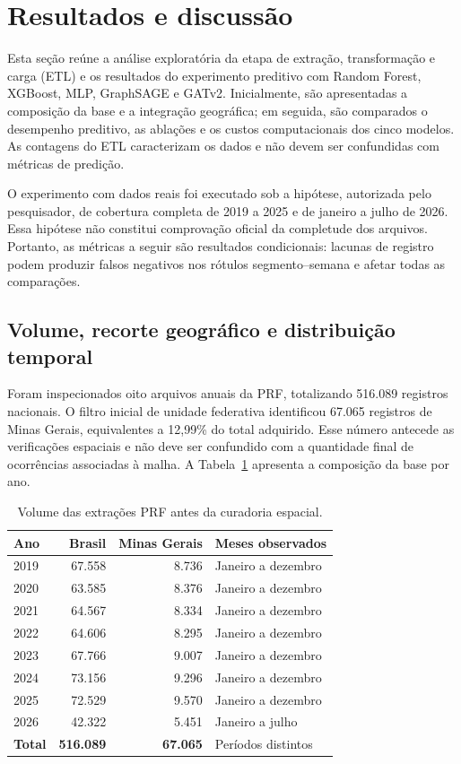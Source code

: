 \documentclass[12pt]{article}
\begin{document}
\section{Resultados e discussão}
\label{sec:resultados-preliminares}
\label{sec:resultados}

Esta seção reúne a análise exploratória da etapa de extração,
transformação e carga (ETL) e os resultados do experimento preditivo
com Random Forest, XGBoost, MLP, GraphSAGE e GATv2. Inicialmente, são
apresentadas a composição da base e a
integração geográfica; em seguida, são comparados o desempenho
preditivo, as ablações e os custos computacionais dos cinco modelos.
As contagens do ETL caracterizam os dados e não devem ser confundidas
com métricas de predição.

O experimento com dados reais foi executado sob a hipótese, autorizada
pelo pesquisador, de cobertura completa de 2019 a 2025 e de janeiro a
julho de 2026. Essa hipótese não constitui comprovação oficial da
completude dos arquivos. Portanto, as métricas a seguir são resultados
condicionais: lacunas de registro podem produzir falsos negativos nos
rótulos segmento--semana e afetar todas as comparações.

\subsection{Volume, recorte geográfico e distribuição temporal}

Foram inspecionados oito arquivos anuais da PRF, totalizando 516.089
registros nacionais. O filtro inicial de unidade federativa identificou
67.065 registros de Minas Gerais, equivalentes a 12,99\% do total
adquirido. Esse número antecede as verificações espaciais e não deve ser
confundido com a quantidade final de ocorrências associadas à malha.
A Tabela~\ref{tab:etl-volume} apresenta a composição da base por ano.

\begin{table}[!ht]
\centering
\caption{Volume das extrações PRF antes da curadoria espacial.}
\label{tab:etl-volume}
\small
\begin{tabular}{lrrl}
  \toprule
  \textbf{Ano} & \textbf{Brasil} & \textbf{Minas Gerais} & \textbf{Meses observados} \\
\midrule
2019 & 67.558 & 8.736 & Janeiro a dezembro \\
2020 & 63.585 & 8.376 & Janeiro a dezembro \\
2021 & 64.567 & 8.334 & Janeiro a dezembro \\
2022 & 64.606 & 8.295 & Janeiro a dezembro \\
2023 & 67.766 & 9.007 & Janeiro a dezembro \\
2024 & 73.156 & 9.296 & Janeiro a dezembro \\
2025 & 72.529 & 9.570 & Janeiro a dezembro \\
2026 & 42.322 & 5.451 & Janeiro a julho \\
\midrule
  \textbf{Total} & \textbf{516.089} & \textbf{67.065} & Períodos distintos \\
\bottomrule
\end{tabular}
\end{table}
\end{document}
